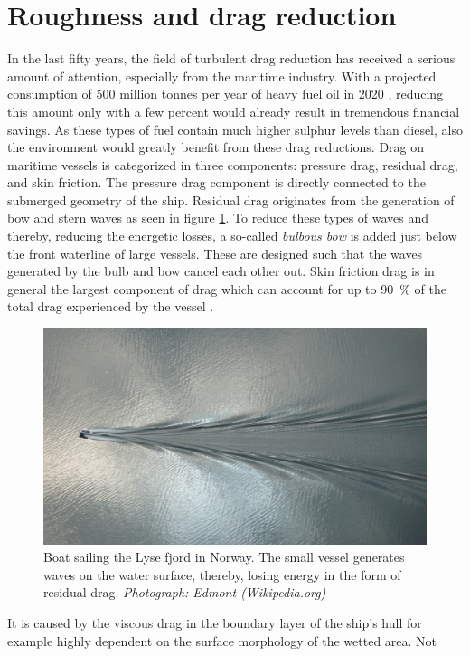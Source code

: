 \section*{Roughness and drag reduction}
In the last fifty years, the field of turbulent drag reduction has received a serious
amount of attention, especially from the maritime industry. With a projected
consumption of 500 million tonnes per year of heavy fuel oil in 2020
\citep{tradefuel2009}, reducing this amount only with a few percent would
already result in tremendous financial savings. As these types of fuel contain
much higher sulphur levels than diesel, also the environment would greatly
benefit from these drag reductions. Drag on maritime vessels is categorized in
three components: pressure drag, residual drag, and skin friction. The
pressure drag component is directly connected to the submerged geometry of the
ship. Residual drag originates from the generation of bow and stern waves as
seen in figure \ref{fig:intro_wave}. To reduce these types of waves and
thereby, reducing the energetic losses, a so-called \emph{bulbous bow} is
added just below the front waterline of large vessels. These are designed such
that the waves generated by the bulb and bow cancel each other out. Skin
friction drag is in general the largest component of drag which can account
for up to \SI{90}{\percent} of the total drag experienced by the vessel
\citep{Schultz2010}.
\begin{figure}[h]
    \centering
    \includegraphics[width=0.8\linewidth]{fig/wakepattern.jpg}
    \caption{Boat sailing the Lyse fjord in Norway. The small vessel
    generates waves on the water surface, thereby, losing energy in the form
    of residual drag. \textit{Photograph: Edmont (Wikipedia.org)}}
    \label{fig:intro_wave}
\end{figure}
It is caused by the viscous drag in the boundary layer of the ship's hull 
for example highly dependent on the surface morphology of the wetted area. Not

